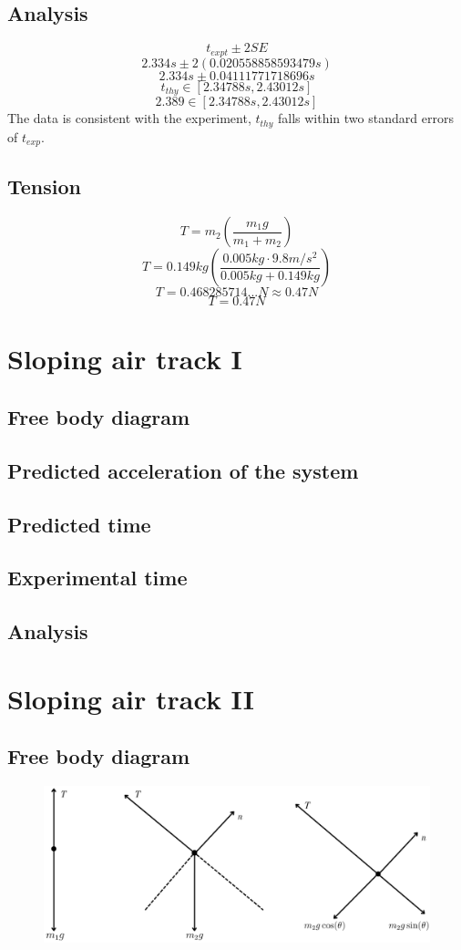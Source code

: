 \documentclass[11pt, letterpaper, includehead]{article}
\begin{document}
\subsection{Analysis} %
$$t_{expt} \pm 2SE$$
$$2.334s \pm 2( 0.020558858593479 s)$$
$$2.334s \pm 0.04111771718696 s$$
$$t_{thy}\in [2.34788 s, 2.43012 s]$$
$$2.389 \in [2.34788 s, 2.43012 s]$$
The data is consistent with the experiment, $t_{thy}$ falls within two standard errors of $t_{exp}$.

\subsection{Tension} %
$$T = m_2 \left( \frac{m_1 g}{m_1 + m_2} \right)$$
$$T = 0.149kg \left( \frac{0.005kg \cdot 9.8m/s^2}{0.005kg + 0.149kg} \right)$$
$$T = 0.468285714...N \approx 0.47N $$
$$\boxed{T = 0.47N}$$


\section{Sloping air track I} %
\subsection{Free body diagram}
\subsection{Predicted acceleration of the system}
\subsection{Predicted time}
\subsection{Experimental time}
\subsection{Analysis}


\section{Sloping air track II} %
\subsection{Free body diagram}
\begin{figure}[H] %
  \centering 
  \includegraphics[width=15cm]{part_3.png}
\end{figure}
\end{document}

